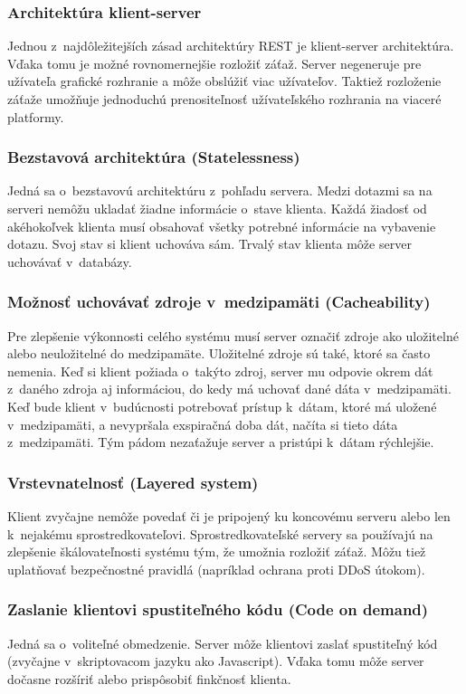 \documentclass[slovak]{fitthesis}
\begin{document}
\subsubsection{Architektúra klient-server}
Jednou z~najdôležitejších zásad architektúry REST je klient-server architektúra. Vďaka tomu je možné rovnomernejšie rozložiť záťaž. Server negeneruje pre užívateľa grafické rozhranie a môže obslúžiť viac užívateľov. Taktiež rozloženie záťaže umožňuje jednoduchú prenositeľnosť užívateľského rozhrania na viaceré platformy.

\subsubsection{Bezstavová architektúra (Statelessness)}
Jedná sa o~bezstavovú architektúru z~pohľadu servera. Medzi dotazmi sa na serveri nemôžu ukladať žiadne informácie o~stave klienta. Každá žiadosť od akéhokoľvek klienta musí obsahovať všetky potrebné informácie na vybavenie dotazu. Svoj stav si klient uchováva sám. Trvalý stav klienta môže server uchovávať v~databázy.

\subsubsection{Možnosť uchovávať zdroje v~medzipamäti (Cacheability)}
Pre zlepšenie výkonnosti celého systému musí server označiť zdroje ako uložitelné alebo neuložitelné do medzipamäte. Uložitelné zdroje sú také, ktoré sa často nemenia. Keď si klient požiada o~takýto zdroj, server mu odpovie okrem dát z~daného zdroja aj informáciou, do kedy má uchovať dané dáta v~medzipamäti. Keď bude klient v~budúcnosti potrebovať prístup k~dátam, ktoré má uložené v~medzipamäti, a nevypršala exspiračná doba dát, načíta si tieto dáta z~medzipamäti. Tým pádom nezaťažuje server a pristúpi k~dátam rýchlejšie. 

\subsubsection{Vrstevnatelnosť (Layered system)}
Klient zvyčajne nemôže povedať či je pripojený ku koncovému serveru alebo len k~nejakému sprostredkovateľovi. Sprostredkovateľské servery sa používajú na zlepšenie škálovateľnosti systému tým, že umožnia rozložiť záťaž. Môžu tiež uplatňovať bezpečnostné pravidlá (napríklad ochrana proti DDoS útokom).

\subsubsection{Zaslanie klientovi spustiteľného kódu (Code on demand)}
Jedná sa o~voliteľné obmedzenie. Server môže klientovi zaslať spustiteľný kód (zvyčajne v~skriptovacom jazyku ako Javascript). Vďaka tomu môže server dočasne rozšíriť alebo prispôsobiť finkčnosť klienta.
\end{document}

